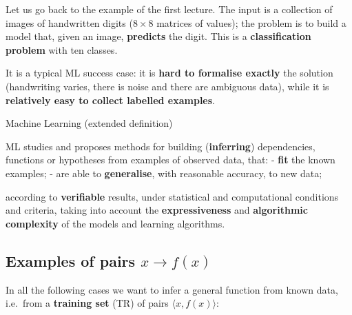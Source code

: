 Let us go back to the example of the first lecture. The input is a
collection of images of handwritten digits (\(8\times 8\) matrices of
values); the problem is to build a model that, given an image,
\textbf{predicts} the digit. This is a \textbf{classification problem}
with ten classes.

It is a typical ML success case: it is \textbf{hard to formalise
exactly} the solution (handwriting varies, there is noise and there are
ambiguous data), while it is \textbf{relatively easy to collect labelled
examples}.

\begin{boxdefinition}{Machine Learning (extended definition)}

ML studies and proposes methods for building (\textbf{inferring})
dependencies, functions or hypotheses from examples of observed data,
that: - \textbf{fit} the known examples; - are able to
\textbf{generalise}, with reasonable accuracy, to new data;

according to \textbf{verifiable} results, under statistical and
computational conditions and criteria, taking into account the
\textbf{expressiveness} and \textbf{algorithmic complexity} of the
models and learning algorithms.

\end{boxdefinition}

\subsection{\texorpdfstring{Examples of pairs
\(x \to f(x)\)}{Examples of pairs x \textbackslash to f(x)}}\label{esempi-di-coppie-x-to-fx}

In all the following cases we want to infer a general function from
known data, i.e.\ from a \textbf{training set} (TR) of pairs
\(\langle x, f(x)\rangle\):

